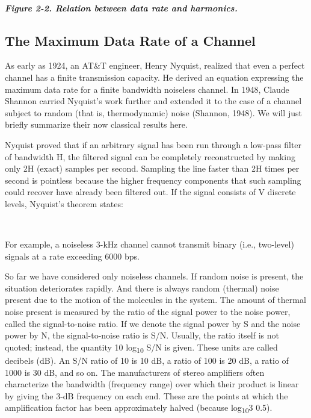 \documentclass[b5paper,11pt]{memoir}
\begin{document}
\subparagraph[Figure 2-2. Relation between data rate and
harmonics.]{\texorpdfstring{\protect\hypertarget{0130661023_ch02lev1sec1.htmlux5cux23ch02fig02}{}{}Figure
2-2. Relation between data rate and
harmonics.}{Figure 2-2. Relation between data rate and harmonics.}}


\protect\hypertarget{0130661023_ch02lev1sec1.htmlux5cux23ch02lev2sec3}{}{}

\subsection{The Maximum Data Rate of a Channel}

As early as 1924, an AT\&T engineer, Henry Nyquist, realized that even a
perfect channel has a finite transmission capacity. He derived an
equation expressing the maximum data rate for a finite bandwidth
noiseless channel. In 1948, Claude Shannon carried Nyquist's work
further and extended it to the case of a channel subject to random (that
is, thermodynamic) noise (Shannon, 1948). We will just briefly summarize
their now classical results here.

Nyquist proved that if an arbitrary signal has been run through a
low-pass filter of bandwidth {H}, the filtered signal can be completely
reconstructed by making only 2{H} (exact) samples per second. Sampling
the line faster than 2{H} times per second is pointless because the
higher frequency components that such sampling could recover have
already been filtered out. If the signal consists of {V} discrete
levels, Nyquist's theorem states:


~

For example, a noiseless 3-kHz channel cannot transmit binary (i.e.,
two-level) signals at a rate exceeding 6000 bps.

So far we have considered only noiseless channels. If random noise is
present, the situation deteriorates rapidly. And there is always random
(thermal) noise present due to the motion of the molecules in the
system. The amount of thermal noise present is measured by the ratio of
the signal power to the noise power, called the {signal-to-noise ratio}.
If we denote the signal power by {S} and the noise power by {N}, the
signal-to-noise ratio is {S/N}. Usually, the ratio itself is not quoted;
instead, the quantity 10 log\textsubscript{10} {S/N} is given. These
units are called {decibels} (dB). An {S/N} ratio of 10 is 10 dB, a ratio
of 100 is 20 dB, a ratio of 1000 is 30 dB, and so on. The manufacturers
of stereo amplifiers often characterize the bandwidth (frequency range)
over which their product is linear by giving the 3-dB frequency on each
end. These are the points at which the amplification factor has been
approximately halved (because log\textsubscript{10}3
 0.5).
\end{document}
